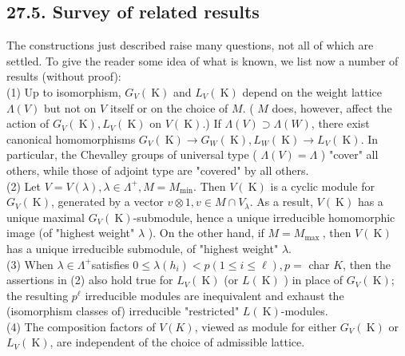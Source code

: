 \documentclass[10pt]{article}
\begin{document}
\subsection*{27.5. Survey of related results}
The constructions just described raise many questions, not all of which are settled. To give the reader some idea of what is known, we list now a number of results (without proof):\\
(1) Up to isomorphism, $G_{V}(\mathrm{~K})$ and $L_{V}(\mathrm{~K})$ depend on the weight lattice $\Lambda(V)$ but not on $V$ itself or on the choice of $M$. ( $M$ does, however, affect the action of $G_{V}(\mathrm{~K}), L_{V}(\mathrm{~K})$ on $V(\mathrm{~K})$.) If $\Lambda(V) \supset \Lambda(W)$, there exist canonical homomorphisms $G_{V}(\mathrm{~K}) \rightarrow G_{W}(\mathrm{~K}), L_{W}(\mathrm{~K}) \rightarrow L_{V}(\mathrm{~K})$. In particular, the Chevalley groups of universal type ( $\Lambda(V)=\Lambda$ ) "cover" all others, while those of adjoint type are "covered" by all others.\\
(2) Let $V=V(\lambda), \lambda \in \Lambda^{+}, M=M_{\min }$. Then $V(\mathrm{~K})$ is a cyclic module for $G_{V}(\mathrm{~K})$, generated by a vector $v \otimes 1, v \in M \cap V_{\lambda}$. As a result, $V(\mathrm{~K})$ has a unique maximal $G_{V}(\mathrm{~K})$-submodule, hence a unique irreducible homomorphic image (of "highest weight" $\lambda$ ). On the other hand, if $M=M_{\text {max }}$, then $V(\mathrm{~K})$ has a unique irreducible submodule, of "highest weight" $\lambda$.\\
(3) When $\lambda \in \Lambda^{+}$satisfies $0 \leq \lambda\left(h_{i}\right)<p(1 \leq i \leq \ell), p=$ char $K$, then the assertions in (2) also hold true for $L_{V}(\mathrm{~K})$ (or $L(\mathrm{~K})$ ) in place of $G_{V}(\mathrm{~K})$; the resulting $p^{\ell}$ irreducible modules are inequivalent and exhaust the (isomorphism classes of) irreducible "restricted" $L(\mathrm{~K})$-modules.\\
(4) The composition factors of $V(K)$, viewed as module for either $G_{V}(\mathrm{~K})$ or $L_{V}(\mathrm{~K})$, are independent of the choice of admissible lattice.
\end{document}
